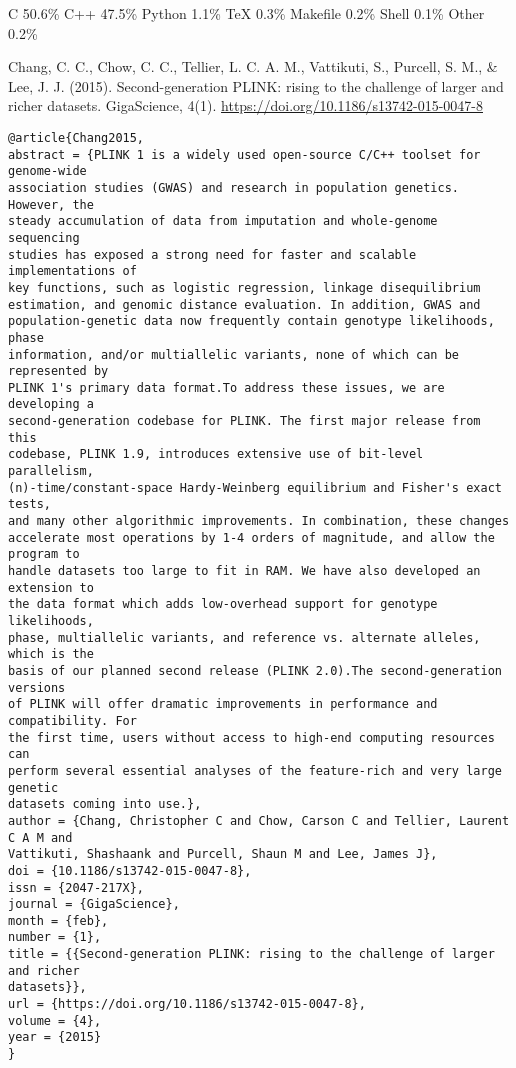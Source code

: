\documentclass[]{article}
\begin{document}
C 50.6\% C++ 47.5\% Python 1.1\% TeX 0.3\% Makefile 0.2\% Shell 0.1\% Other 0.2\% 

Chang, C. C., Chow, C. C., Tellier, L. C. A. M., Vattikuti, S., Purcell, S. M., \& Lee, J. J. (2015). Second-generation PLINK: rising to the challenge of larger and richer datasets. GigaScience, 4(1). \url{https://doi.org/10.1186/s13742-015-0047-8}

\begin{verbatim}
@article{Chang2015,
abstract = {PLINK 1 is a widely used open-source C/C++ toolset for genome-wide
association studies (GWAS) and research in population genetics. However, the
steady accumulation of data from imputation and whole-genome sequencing
studies has exposed a strong need for faster and scalable implementations of
key functions, such as logistic regression, linkage disequilibrium
estimation, and genomic distance evaluation. In addition, GWAS and
population-genetic data now frequently contain genotype likelihoods, phase
information, and/or multiallelic variants, none of which can be represented by
PLINK 1's primary data format.To address these issues, we are developing a
second-generation codebase for PLINK. The first major release from this
codebase, PLINK 1.9, introduces extensive use of bit-level parallelism,
(n)-time/constant-space Hardy-Weinberg equilibrium and Fisher's exact tests,
and many other algorithmic improvements. In combination, these changes
accelerate most operations by 1-4 orders of magnitude, and allow the program to
handle datasets too large to fit in RAM. We have also developed an extension to
the data format which adds low-overhead support for genotype likelihoods,
phase, multiallelic variants, and reference vs. alternate alleles, which is the
basis of our planned second release (PLINK 2.0).The second-generation versions
of PLINK will offer dramatic improvements in performance and compatibility. For
the first time, users without access to high-end computing resources can
perform several essential analyses of the feature-rich and very large genetic
datasets coming into use.},
author = {Chang, Christopher C and Chow, Carson C and Tellier, Laurent C A M and
Vattikuti, Shashaank and Purcell, Shaun M and Lee, James J},
doi = {10.1186/s13742-015-0047-8},
issn = {2047-217X},
journal = {GigaScience},
month = {feb},
number = {1},
title = {{Second-generation PLINK: rising to the challenge of larger and richer
datasets}},
url = {https://doi.org/10.1186/s13742-015-0047-8},
volume = {4},
year = {2015}
}
\end{verbatim}
\end{document}
